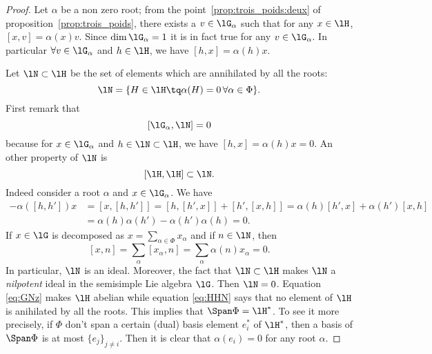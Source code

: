 \begin{proof}
Let $\alpha$ be a non zero root; from the point~\ref{prop:trois_poids:deux} of proposition~\ref{prop:trois_poids}, there exists a $v\in\lG_{\alpha}$ such that for any $x\in\lH$, $[x,v]=\alpha(x)v$. Since $\dim\lG_{\alpha}=1$ it is in fact true for any $v\in\lG_{\alpha}$. In particular $\forall v\in\lG_{\alpha}$ and $h\in\lH$, we have $[h,x]=\alpha(h)x$.

Let $\lN\subset\lH$ be the set of elements which are annihilated by all the roots:
\begin{equation}
    \lN=\{ H\in\lH\tq\alpha(H)=0\,\forall \alpha\in\Phi \}.
\end{equation}
First remark that
\begin{equation}\label{eq:GNz}
[\lG_{\alpha},\lN]=0
\end{equation}
because for $x\in\lG_{\alpha}$ and $h\in\lN\subset\lH$, we have $[h,x]=\alpha(h)x=0$. An other property of $\lN$ is
\begin{equation}\label{eq:HHN}
[\lH,\lH]\subset\lN.
\end{equation}
Indeed consider a root $\alpha$ and $x\in\lG_{\alpha}$. We have
\begin{equation}
\begin{split}
-\alpha([h,h'])x&=[x,[h,h']]
=[h,[h',x]]+[h',[x,h]]
=\alpha(h)[h',x]+\alpha(h')[x,h]\\
&=\alpha(h)\alpha(h')-\alpha(h')\alpha(h)
=0.
\end{split}
\end{equation}
If $x\in\lG$ is decomposed as $x=\sum_{\alpha\in\Phi}x_{\alpha}$ and if $n\in\lN$, then
\[
[x,n]=\sum_{\alpha}[x_{\alpha},n]=\sum_{\alpha}\alpha(n)x_{\alpha}=0.
\]
In particular, $\lN$ is an ideal. Moreover, the fact that $\lN\subset\lH$ makes $\lN$ a \emph{nilpotent} ideal in the semisimple Lie algebra $\lG$. Then $\lN=0$. Equation \eqref{eq:GNz} makes $\lH$ abelian while equation \eqref{eq:HHN} says that no element of $\lH$ is anihilated by all the roots. This implies that $\Span\Phi=\lH^*$. To see it more precisely, if $\Phi$ don't span a certain (dual) basis element $e_i^*$ of $\lH^*$, then a basis of $\Span\Phi$ is at most $\{e_j\}_{j\neq i}$. Then it is clear that $\alpha(e_i)=0$ for any root $\alpha$.
\end{proof}


